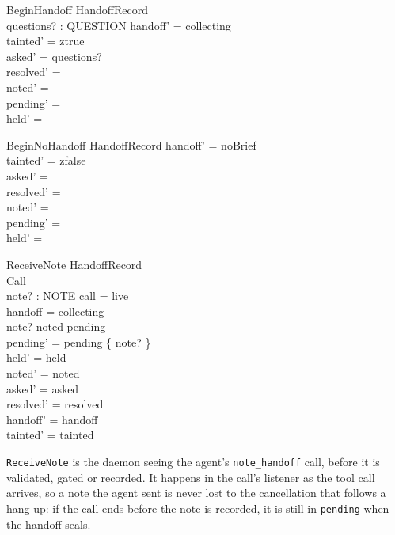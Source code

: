 \documentclass[a4paper,10pt,fleqn]{article}
\begin{document}
\begin{schema}{BeginHandoff}
  \Delta HandoffRecord \\
  questions? : \power QUESTION
\where
  handoff' = collecting \\
  tainted' = ztrue \\
  asked' = questions? \\
  resolved' = \emptyset \\
  noted' = \emptyset \\
  pending' = \emptyset \\
  held' = \emptyset
\end{schema}

\begin{schema}{BeginNoHandoff}
  \Delta HandoffRecord
\where
  handoff' = noBrief \\
  tainted' = zfalse \\
  asked' = \emptyset \\
  resolved' = \emptyset \\
  noted' = \emptyset \\
  pending' = \emptyset \\
  held' = \emptyset
\end{schema}

\begin{schema}{ReceiveNote}
  \Delta HandoffRecord \\
  Call \\
  note? : NOTE
\where
  call = live \\
  handoff = collecting \\
  note? \notin noted \cup pending \\
  pending' = pending \cup \{ note? \} \\
  held' = held \\
  noted' = noted \\
  asked' = asked \\
  resolved' = resolved \\
  handoff' = handoff \\
  tainted' = tainted
\end{schema}

\texttt{ReceiveNote} is the daemon seeing the agent's \texttt{note\_handoff}
call, before it is validated, gated or recorded. It happens in the call's
listener as the tool call arrives, so a note the agent sent is never lost to
the cancellation that follows a hang-up: if the call ends before the note is
recorded, it is still in \texttt{pending} when the handoff seals.
\end{document}
